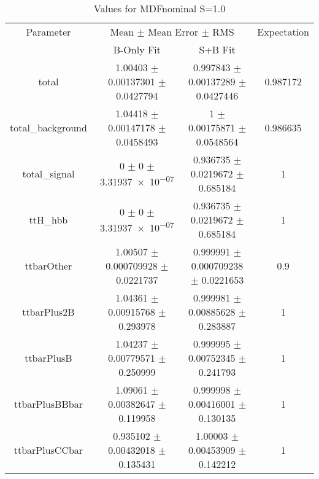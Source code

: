 \begin{table}
\centering
\caption{Values for MDFnominal S=1.0}
\begin{tabular}{cccc}
\toprule
Parameter & \multicolumn{2}{c}{Mean $\pm$ Mean Error $\pm$ RMS} & Expectation\\
 & B-Only Fit & S+B Fit & \\
\midrule
total & \num{1.00403} $\pm$ \num{0.00137301} $\pm$ \num{0.0427794} & \num{0.997843} $\pm$ \num{0.00137289} $\pm$ \num{0.0427446} & \num{0.987172}\\
total\_background & \num{1.04418} $\pm$ \num{0.00147178} $\pm$ \num{0.0458493} & \num{1} $\pm$ \num{0.00175871} $\pm$ \num{0.0548564} & \num{0.986635}\\
total\_signal & \num{0} $\pm$ \num{0} $\pm$ \num{3.31937e-07} & \num{0.936735} $\pm$ \num{0.0219672} $\pm$ \num{0.685184} & \num{1}\\
ttH\_hbb & \num{0} $\pm$ \num{0} $\pm$ \num{3.31937e-07} & \num{0.936735} $\pm$ \num{0.0219672} $\pm$ \num{0.685184} & \num{1}\\
ttbarOther & \num{1.00507} $\pm$ \num{0.000709928} $\pm$ \num{0.0221737} & \num{0.999991} $\pm$ \num{0.000709238} $\pm$ \num{0.0221653} & \num{0.9}\\
ttbarPlus2B & \num{1.04361} $\pm$ \num{0.00915768} $\pm$ \num{0.293978} & \num{0.999981} $\pm$ \num{0.00885628} $\pm$ \num{0.283887} & \num{1}\\
ttbarPlusB & \num{1.04237} $\pm$ \num{0.00779571} $\pm$ \num{0.250999} & \num{0.999995} $\pm$ \num{0.00752345} $\pm$ \num{0.241793} & \num{1}\\
ttbarPlusBBbar & \num{1.09061} $\pm$ \num{0.00382647} $\pm$ \num{0.119958} & \num{0.999998} $\pm$ \num{0.00416001} $\pm$ \num{0.130135} & \num{1}\\
ttbarPlusCCbar & \num{0.935102} $\pm$ \num{0.00432018} $\pm$ \num{0.135431} & \num{1.00003} $\pm$ \num{0.00453909} $\pm$ \num{0.142212} & \num{1}\\
\bottomrule
\end{tabular}
\end{table}